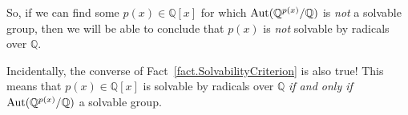 So, if we can find some $p(x)\in \mathbb{Q}[x]$ for which $\operatorname{Aut}(\mathbb{Q}^{p(x)}/\mathbb{Q})$ is \emph{not} a solvable group, then we will be able to conclude that 
$p(x)$ is \emph{not} solvable by radicals over $\mathbb{Q}$.

Incidentally, the converse of Fact~\ref{fact.SolvabilityCriterion} is also true! This means that $p(x)\in \mathbb{Q}[x]$ is solvable by radicals over $\mathbb{Q}$ \emph{if and only if} $\operatorname{Aut}(\mathbb{Q}^{p(x)}/\mathbb{Q})$ a solvable group.











